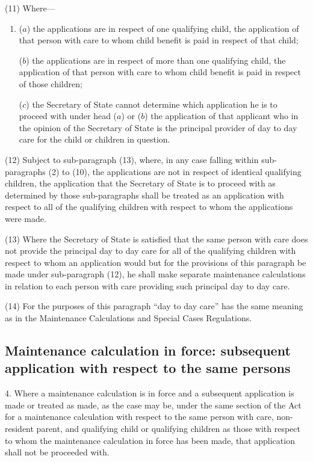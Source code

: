 \documentclass[12pt,a4paper]{article}
\begin{document}
(11) Where—
\begin{enumerate}\item[]
($a$) the applications are in respect of one qualifying child, the application of that person with care to whom child benefit is paid in respect of that child;

($b$) the applications are in respect of more than one qualifying child, the application of that person with care to whom child benefit is paid in respect of those children;

($c$) the Secretary of State cannot determine which application he is to proceed with under head ($a$)  or ($b$)  the application of that applicant who in the opinion of the Secretary of State is the principal provider of day to day care for the child or children in question.
\end{enumerate}

(12) Subject to sub-paragraph (13), where, in any case falling within sub-paragraphs (2) to (10), the applications are not in respect of identical qualifying children, the application that the Secretary of State is to proceed with as determined by those sub-paragraphs shall be treated as an application with respect to all of the qualifying children with respect to whom the applications were made.

(13) Where the Secretary of State is satisfied that the same person with care does not provide the principal day to day care for all of the qualifying children with respect to whom an application would but for the provisions of this paragraph be made under sub-paragraph (12), he shall make separate maintenance calculations in relation to each person with care providing such principal day to day care.

(14) For the purposes of this paragraph “day to day care” has the same meaning as in the Maintenance Calculations and Special Cases Regulations.

\subsection*{Maintenance calculation in force: subsequent application with respect to the same persons}

4.  Where a maintenance calculation is in force and a subsequent application is made or treated as made, as the case may be, under the same section of the Act for a maintenance calculation with respect to the same person with care, non-resident parent, and qualifying child or qualifying children as those with respect to whom the maintenance calculation in force has been made, that application shall not be proceeded with. 
\end{document}

